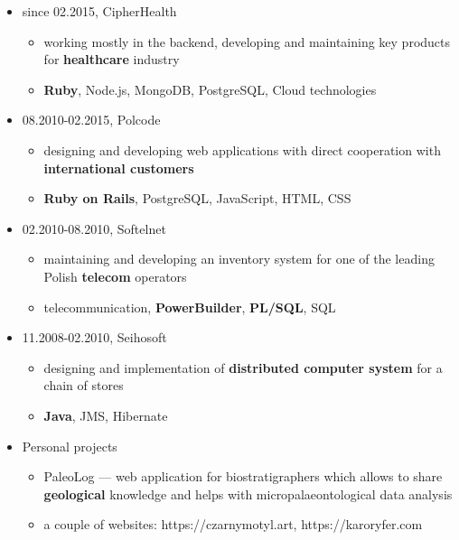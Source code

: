 \documentclass[a4paper]{article}
\begin{document}
\begin{itemize}
  \item
  since 02.2015,
  CipherHealth
  \begin{itemize}
    \item
      working mostly in the backend, developing and maintaining key products for \textbf{healthcare} industry
    \item
      \textbf{Ruby}, Node.js, MongoDB, PostgreSQL, Cloud technologies
  \end{itemize}
  \item
    08.2010-02.2015,
    Polcode
    \begin{itemize}
      \item
        designing and developing web applications with direct cooperation with \textbf{international customers}
      \item
        \textbf{Ruby on Rails}, PostgreSQL, JavaScript, HTML, CSS
    \end{itemize}
  \item
    02.2010-08.2010,
    Softelnet
    \begin{itemize}
      \item
        maintaining and developing an inventory system
        for one of the leading Polish \textbf{telecom} operators
      \item
        telecommunication, \textbf{PowerBuilder}, \textbf{PL/SQL}, SQL
    \end{itemize}
  \item
    11.2008-02.2010,
    Seihosoft
    \begin{itemize}
      \item
        designing and implementation of \textbf{distributed computer system}
        for a chain of stores
      \item
        \textbf{Java}, JMS, Hibernate
    \end{itemize}
  \item
    Personal projects
    \begin{itemize}
      \item
        PaleoLog --- web application for biostratigraphers which allows
        to share \textbf{geological} knowledge
        and helps with micropalaeontological data analysis
      \item
        a couple of websites: https://czarnymotyl.art, https://karoryfer.com
    \end{itemize}
\end{itemize}
\end{document}
